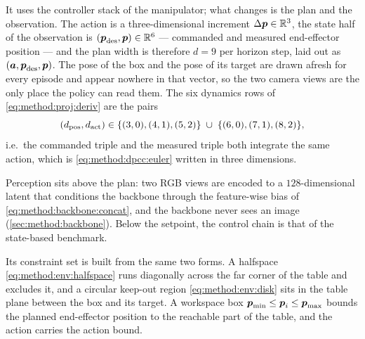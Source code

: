 It uses the controller stack of the manipulator; what changes is the plan and the observation. The action is a three-dimensional increment $\Delta\boldsymbol{p}\in\mathbb{R}^{3}$, the state
half of the observation is $(\boldsymbol{p}_{\textrm{des}},\boldsymbol{p})\in\mathbb{R}^{6}$ --- commanded and measured
end-effector position --- and the plan width is therefore $d = 9$ per horizon step, laid out as
$(\boldsymbol{a},\boldsymbol{p}_{\textrm{des}},\boldsymbol{p})$. The pose of the box and the pose of its target are drawn
afresh for every episode and appear nowhere in that vector, so the two camera views are the only
place the policy can read them.
 The six dynamics rows of
\eqref{eq:method:proj:deriv} are the pairs
\begin{equation}\label{eq:method:dep:varows}
  \left(d_{\textrm{pos}},d_{\textrm{act}}\right) \in
  \{(3,0),(4,1),(5,2)\}\;\cup\;\{(6,0),(7,1),(8,2)\},
\end{equation}
i.e.\ the commanded triple and the measured triple both integrate the same action, which is
\eqref{eq:method:dpcc:euler} written in three dimensions.

Perception sits above the plan: two RGB views are encoded to a $128$-dimensional latent that
conditions the backbone through the feature-wise bias of \eqref{eq:method:backbone:concat}, and the
backbone never sees an image (\autoref{sec:method:backbone}). Below the setpoint, the control chain is
that of the state-based benchmark.

Its constraint set is built from the same two forms. A halfspace
\eqref{eq:method:env:halfspace} runs diagonally across the far corner of the table and excludes it,
and a circular keep-out region \eqref{eq:method:env:disk} sits in the table plane between the box
and its target. A workspace box $\boldsymbol{p}_{\textrm{min}}\le\boldsymbol{p}_{i}\le\boldsymbol{p}_{\textrm{max}}$ bounds the
planned end-effector position to the reachable part of the table, and the action carries the action
bound.

